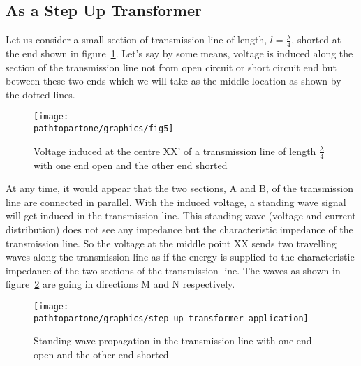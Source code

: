 \subsection{As a Step Up Transformer}
Let us consider a small section of transmission line of length, $l = \frac{\lambda}{4}$, shorted at the end shown in figure~\ref{fig:fig5}. Let's say by some means, voltage is induced along the section of the transmission line not from open circuit or short circuit end but between these two ends which we will take as the middle location as shown by the dotted lines.
\begin{figure}[h]
\centering
\texttt{[image: \\pathtopartone/graphics/fig5]}
\caption{Voltage induced at the centre XX' of a transmission line of length $\frac{\lambda}{4}$ with one end open and the other end shorted}
\label{fig:fig5}
\end{figure}

 At any time, it would appear that the two sections, A and B, of the transmission line are connected in parallel. With the induced voltage, a standing wave signal will get induced in the transmission line. This standing wave (voltage and current distribution) does not see any impedance but the characteristic impedance of the transmission line. So the voltage at the middle point XX sends two travelling waves along the transmission line as if the energy is supplied to the characteristic impedance of the two sections of the transmission line. The waves as shown in figure~\ref{fig:fig6} are going in directions M and N respectively.
 \begin{figure}[h]
\centering
\texttt{[image: \\pathtopartone/graphics/step\_up\_transformer\_application]}
\caption{Standing wave propagation in the transmission line with one end open and the other end shorted}
\label{fig:fig6}
\end{figure}

